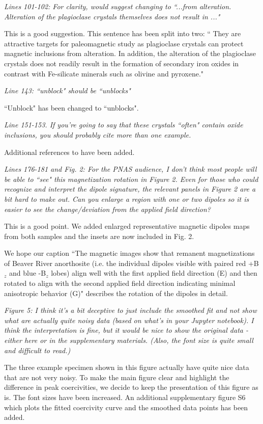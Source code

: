 \documentclass[11pt, letterpaper]{article}
\begin{document}
\begin{flushleft}
\textit{Lines 101-102: For clarity, would suggest changing to ``...from alteration. Alteration of the plagioclase crystals themselves does not result in ..."}

This is a good suggestion. This sentence has been split into two: `` They are attractive targets for paleomagnetic study as plagioclase crystals can protect magnetic inclusions from alteration. In addition, the alteration of the plagioclase crystals does not readily result in the formation of secondary iron oxides in contrast with Fe-silicate minerals such as olivine and pyroxene."

\textit{Line 143: ``unblock" should be ``unblocks"}

``Unblock" has been changed to ``unblocks".

\textit{Line 151-153. If you're going to say that these crystals ``often" contain oxide inclusions, you should probably cite more than one example.}

Additional references to \cite{Wenk2011a, Ageeva2016a} have been added. 

\textit{Lines 176-181 and Fig. 2: For the PNAS audience, I don't think most people will be able to ``see" this magnetization rotation in Figure 2. Even for those who could recognize and interpret the dipole signature, the relevant panels in Figure 2 are a bit hard to make out. Can you enlarge a region with one or two dipoles so it is easier to see the change/deviation from the applied field direction?}

This is a good point. We added enlarged representative magnetic dipoles maps from both samples and the insets are now included in Fig. 2. 

We hope our caption  ``The magnetic images show that remanent magnetizations of Beaver River anorthosite (i.e. the individual dipoles visible with paired red +B$_z$ and blue -B$_z$ lobes) align well with the first applied field direction (E) and then rotated to align with the second applied field direction indicating minimal anisotropic behavior (G)" describes the rotation of the dipoles in detail.

\textit{Figure 5: I think it's a bit deceptive to just include the smoothed fit and not show what are actually quite noisy data (based on what's in your Jupyter notebook). I think the interpretation is fine, but it would be nice to show the original data - either here or in the supplementary materials. (Also, the font size is quite small and difficult to read.)}

The three example specimen shown in this figure actually have quite nice data that are not very noisy. To make the main figure clear and highlight the difference in peak coercivities, we decide to keep the presentation of this figure as is. The font sizes have been increased. 
An additional supplementary figure S6 which plots the fitted coercivity curve and the smoothed data points has been added. 


\end{flushleft}
\end{document}

